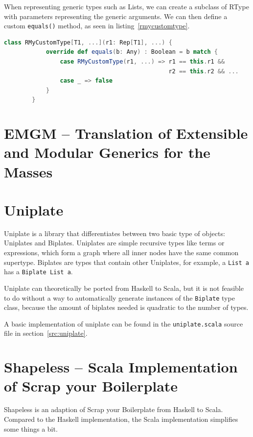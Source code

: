 \documentclass[abstracton,parskip=half]{scrreprt}
\newcommand{\cd}{\texttt}
\begin{document}
    When representing generic types such as Lists, we can create a subclass
    of RType with parameters representing the generic arguments. We can then
    define a custom \cd{equals()} method, as seen in listing~\ref{rmycustomtype}.

    \begin{lstlisting}[language=Scala,gobble=8,float,caption=Representing custom generic types,label=rmycustomtype]
        class RMyCustomType[T1, ...](r1: Rep[T1], ...) {
            override def equals(b: Any) : Boolean = b match {
                case RMyCustomType(r1, ...) => r1 == this.r1 &&
                                               r2 == this.r2 && ...
                case _ => false
            }
        }
    \end{lstlisting}



    \section{EMGM -- Translation of Extensible and Modular Generics for the Masses}

    \section{Uniplate}
    Uniplate is a library that differentiates between two basic type of
    objects: Uniplates and Biplates. Uniplates are simple recursive types
    like terms or expressions, which form a graph where all inner nodes have
    the same common supertype. Biplates are types that contain other Uniplates,
    for example, a \cd{List a} has a \cd{Biplate List a}.


    Uniplate can theoretically be ported from Haskell to Scala, but it is not
    feasible to do without a way to automatically generate instances of the
    \cd{Biplate} type class, because the amount of biplates needed is quadratic
    to the number of types.

    A basic implementation of uniplate can be found in the \cd{uniplate.scala}
    source file in section~\ref{src:uniplate}.


    \section{Shapeless -- Scala Implementation of Scrap your Boilerplate}

    Shapeless is an adaption of Scrap your Boilerplate\cite{DBLP:conf/tldi/LammelJ03}
    from Haskell to Scala. Compared to the Haskell implementation, the Scala
    implementation simplifies some things a bit.
\end{document}

